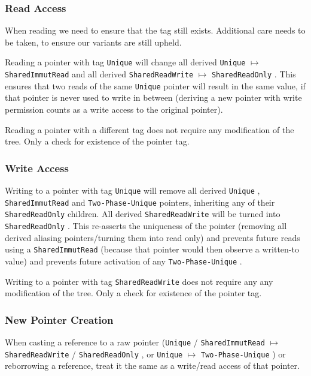 \documentclass[]{article}
\newcommand{\SHRW}{\texttt{SharedReadWrite} }
\newcommand{\SHRO}{\texttt{SharedReadOnly} }
\newcommand{\SHIR}{\texttt{SharedImmutRead} }
\newcommand{\UNQ}{\texttt{Unique} }
\newcommand{\TPU}{\texttt{Two-Phase-Unique} }
\begin{document}
\subsubsection{Read Access}

When reading we need to ensure that the tag still exists. Additional care needs to be taken, to ensure our variants are still upheld.

Reading a pointer with tag \UNQ will change all derived \UNQ $\mapsto$ \SHIR and all derived \SHRW $\mapsto$ \SHRO. This ensures that two reads of the same \UNQ pointer will result in the same value, if that pointer is never used to write in between (deriving a new pointer with write permission counts as a write access to the original pointer).

Reading a pointer with a different tag does not require any modification of the tree. Only a check for existence of the pointer tag.

\subsubsection{Write Access}

Writing to a pointer with tag \UNQ will remove all derived \UNQ, \SHIR and \TPU pointers, inheriting any of their \SHRO children. All derived \SHRW will be turned into \SHRO. This re-asserts the uniqueness of the pointer (removing all derived aliasing pointers/turning them into read only) and prevents future reads using a \SHIR (because that pointer would then observe a written-to value) and prevents future activation of any \TPU.

Writing to a pointer with tag \SHRW does not require any any modification of the tree. Only a check for existence of the pointer tag.

\subsubsection{New Pointer Creation}
When casting a reference to a raw pointer (\UNQ / \SHIR $\mapsto$ \SHRW / \SHRO, or \UNQ $\mapsto$ \TPU)  or reborrowing a reference, treat it the same as a write/read access of that pointer.
\end{document}
